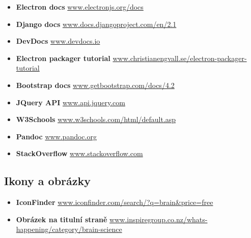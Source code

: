 \begin{itemize}
\tightlist
\item
  \textbf{Electron docs}
  \href{https://electronjs.org/docs}{www.electronjs.org/docs}
\item
  \textbf{Django docs}
  \href{https://docs.djangoproject.com/en/2.1/}{www.docs.djangoproject.com/en/2.1}
\item
  \textbf{DevDocs} \href{https://devdocs.io/}{www.devdocs.io}
\item
  \textbf{Electron packager tutorial}
  \href{https://www.christianengvall.se/electron-packager-tutorial/}{www.christianengvall.se/electron-packager-tutorial}
\item
  \textbf{Bootstrap docs}
  \href{https://getbootstrap.com/docs/4.2/getting-started/introduction/}{www.getbootstrap.com/docs/4.2}
\item
  \textbf{JQuery API} \href{https://api.jquery.com/}{www.api.jquery.com}
\item
  \textbf{W3Schools}
  \href{https://www.w3schools.com/html/default.asp}{www.w3schools.com/html/default.asp}
\item
  \textbf{Pandoc} \href{https://pandoc.org/}{www.pandoc.org}
\item
  \textbf{StackOverflow}
  \href{https://stackoverflow.com/}{www.stackoverflow.com}
\end{itemize}

\hypertarget{ikony-a-obruxe1zky}{%
\subsection{Ikony a obrázky}\label{ikony-a-obruxe1zky}}

\begin{itemize}
\tightlist
\item
  \textbf{IconFinder}
  \href{https://www.iconfinder.com/search/?q=brain\&price=free}{www.iconfinder.com/search/?q=brain\&price=free}
\item
  \textbf{Obrázek na titulní straně}
  \href{http://www.inspiregroup.co.nz/whats-happening/category/brain-science/}{www.inspiregroup.co.nz/whats-happening/category/brain-science}
\end{itemize}